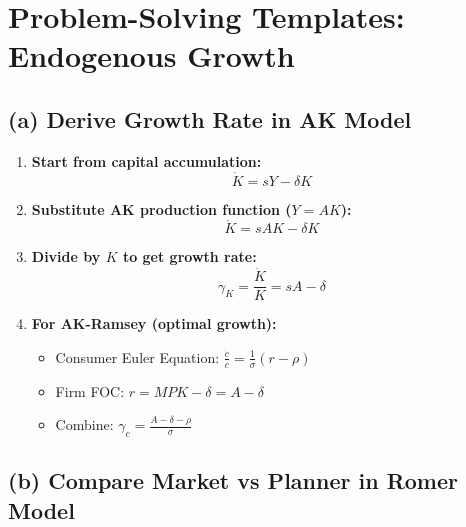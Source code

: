 
\section{Problem-Solving Templates: Endogenous Growth}

\subsection*{(a) Derive Growth Rate in AK Model}

\begin{enumerate}
    \item \textbf{Start from capital accumulation:}
    \[
    \dot{K} = sY - \delta K
    \]
    
    \item \textbf{Substitute AK production function ($Y = AK$):}
    \[
    \dot{K} = sAK - \delta K
    \]
    
    \item \textbf{Divide by $K$ to get growth rate:}
    \[
    \gamma_K = \frac{\dot{K}}{K} = sA - \delta
    \]
    
    \item \textbf{For AK-Ramsey (optimal growth):}
    \begin{itemize}
        \item Consumer Euler Equation: $\frac{\dot{c}}{c} = \frac{1}{\sigma}(r - \rho)$
        \item Firm FOC: $r = MPK - \delta = A - \delta$
        \item Combine: $\gamma_c = \frac{A - \delta - \rho}{\sigma}$
    \end{itemize}
\end{enumerate}

\begin{resultbox}
\quad
{}
\end{resultbox}

\medskip

\subsection*{(b) Compare Market vs Planner in Romer Model}

